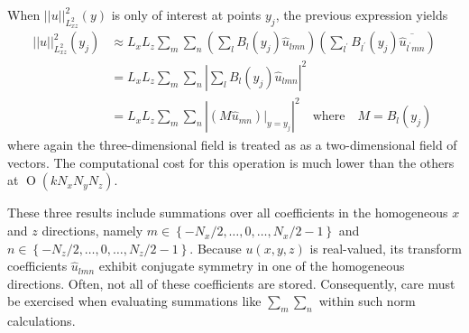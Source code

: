 \documentclass[letterpaper,11pt,nointlimits,reqno]{amsart}
\newcommand{\OO}[1]{\operatorname{O}\left(#1\right)}
\begin{document}
When $\left|\left|u\right|\right|^{2}_{L^{2}_{xz}} \!(y)$ is
only of interest at points $y_j$, the previous expression yields
\begin{align}
  \left|\left|
    u
  \right|\right|^{2}_{L^{2}_{xz}}
  \!(y_j)
&\approx
  L_x L_z
  \sum_{m} \sum_{n}
  \left(
    \sum_{l}
    B_l\!\left(y_j\right)
    \hat{u}_{l m n}
  \right)
  \left(
    \sum_{l^\prime}
    B_{l^\prime}\!\left(y_j\right)
    \overline{\hat{u}_{l^\prime m n}}
  \right)
\\ &=
  L_x L_z
  \sum_{m} \sum_{n}
  \left|
    \sum_{l}
    B_l\!\left(y_j\right)
    \hat{u}_{l m n}
  \right|^{2}
\\ &=
  L_x L_z
  \sum_{m} \sum_{n}
  \left|
      \left(M \hat{u}_{m n}\right)\bigr|_{y=y_j}
  \right|^{2}
  \quad\text{where}\quad
  M = B_l\!\left(y_j\right)
\end{align}
where again the three-dimensional field is treated as as a two-dimensional
field of vectors.  The computational cost for this operation is much lower than
the others at $\OO{k N_x N_y N_z}$.

These three results include summations over all coefficients in the homogeneous
$x$ and $z$ directions, namely $m \in \left\{-N_x/2, \dots, 0, \dots,
N_x/2-1\right\}$ and $n \in \left\{-N_z/2, \dots, 0, \dots, N_z/2-1\right\}$.
Because $u\!\left(x,y,z\right)$ is real-valued, its transform coefficients
$\hat{u}_{lmn}$ exhibit conjugate symmetry in one of the homogeneous
directions.  Often, not all of these coefficients are stored.  Consequently,
care must be exercised when evaluating summations like $\sum_m \sum_n$ within
such norm calculations.
\end{document}
